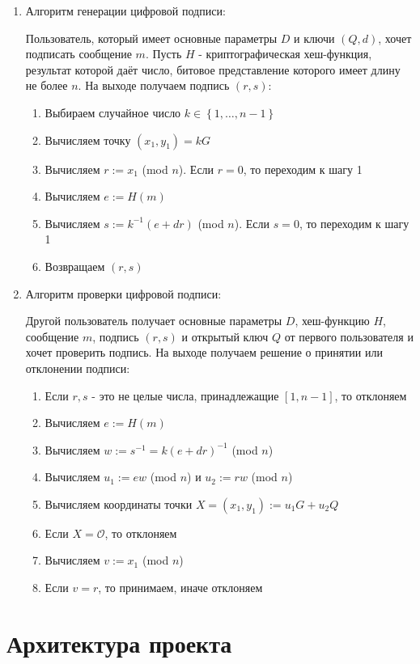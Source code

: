 \documentclass{article}
\begin{document}
\begin{enumerate}
      \item Алгоритм генерации цифровой подписи:

      Пользователь, который имеет основные параметры $D$ и ключи $(Q,d)$, хочет подписать сообщение $m$. Пусть $H$ - криптографическая хеш-функция, результат которой даёт число, битовое представление которого имеет длину не более $n$. На выходе получаем подпись $(r,s)$:

      \begin{enumerate}
        \item Выбираем случайное число $k\in \left\{1,\dots,n-1\right\}$
        \item Вычисляем точку $(x_1,y_1)= kG$
        \item Вычисляем $r := x_1$ (mod $n$). Если $r=0$, то переходим к шагу 1
        \item Вычисляем $e := H(m)$
        \item Вычисляем $s := k^{-1}(e+dr)$ (mod $n$). Если $s=0$, то переходим к шагу 1
        \item Возвращаем $(r,s)$
      \end{enumerate}

      \item Алгоритм проверки цифровой подписи:

      Другой пользователь получает основные параметры $D$, хеш-функцию $H$, сообщение $m$, подпись $(r,s)$ и открытый ключ $Q$ от первого пользователя и хочет проверить подпись. На выходе получаем решение о принятии или отклонении подписи:

      \begin{enumerate}
        \item Если $r,s$ - это не целые числа, принадлежащие $[1,n-1]$, то отклоняем
        \item Вычисляем $e:=H(m)$
        \item Вычисляем $w := s^{-1} = k(e+dr)^{-1}$ (mod $n$) 
        \item Вычисляем $u_1:=ew$ (mod $n$) и $u_2:=rw$ (mod $n$)
        \item Вычисляем координаты точки $X=(x_1,y_1):=u_1G+u_2Q$
        \item Если $X=\mathcal{O}$, то отклоняем
        \item Вычисляем $v:=x_1$ (mod $n$)
        \item Если $v = r$, то принимаем, иначе отклоняем
      \end{enumerate}
    \end{enumerate}
\section{Архитектура проекта} 
\end{document}
